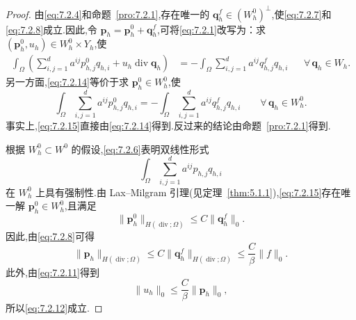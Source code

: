 \begin{proof}
由\eqref{eq:7.2.4}和命题~\ref{pro:7.2.1},存在唯一的 \(\boldsymbol{q}_h^f\in(W_h^0)^\perp\),使\eqref{eq:7.2.7}和\eqref{eq:7.2.8}成立.因此,令 \(\boldsymbol{p}_h=\boldsymbol{p}_h^0+\boldsymbol{q}_h^f\),可将\eqref{eq:7.2.1}改写为：求 \((\boldsymbol{p}_h^0,u_h)\in W_h^0\times Y_h\),使
\begin{equation}\label{eq:7.2.14}
  \begin{aligned}
    \int_\Omega\left(\sum_{i,j=1}^d a^{ij}p_{h,j}^0q_{h,i}+u_h\operatorname{div}\boldsymbol{q}_h\right)
     &=-\int_\Omega\sum_{i,j=1}^d a^{ij}q_{h,j}^fq_{h,i}
       &&\forall\,\boldsymbol{q}_h\in W_h.
  \end{aligned}
\end{equation}
另一方面,\eqref{eq:7.2.14}等价于求 \(\boldsymbol{p}_h^0\in W_h^0\),使
\begin{equation}\label{eq:7.2.15}
  \int_\Omega\sum_{i,j=1}^d a^{ij}p_{h,j}^0q_{h,i}
    =-\int_\Omega\sum_{i,j=1}^d a^{ij}q_{h,j}^fq_{h,i}
    \qquad\forall\,\boldsymbol{q}_h\in W_h^0.
\end{equation}
事实上,\eqref{eq:7.2.15}直接由\eqref{eq:7.2.14}得到.反过来的结论由命题~\ref{pro:7.2.1}得到.

根据 \(W_h^0\subset W^0\) 的假设,\eqref{eq:7.2.6}表明双线性形式
\[
  \int_\Omega\sum_{i,j=1}^d a^{ij}p_{h,j}q_{h,i}
\]
在 \(W_h^0\) 上具有强制性.由 Lax--Milgram 引理(见定理~\ref{thm:5.1.1}),\eqref{eq:7.2.15}存在唯一解 \(\boldsymbol{p}_h^0\in W_h^0\),且满足
\[
  \|\boldsymbol{p}_h^0\|_{H(\operatorname{div};\Omega)}\le C\|\boldsymbol{q}_h^f\|_0.
\]
因此,由\eqref{eq:7.2.8}可得
\begin{equation}\label{eq:7.2.16}
  \|\boldsymbol{p}_h\|_{H(\operatorname{div};\Omega)}
     \le C\|\boldsymbol{q}_h^f\|_{H(\operatorname{div};\Omega)}
     \le\frac{C}{\beta}\|f\|_0.
\end{equation}
此外,由\eqref{eq:7.2.11}得到
\[
  \|u_h\|_0\le\frac{C}{\beta}\|\boldsymbol{p}_h\|_0,
\]
所以\eqref{eq:7.2.12}成立.


\end{proof}
